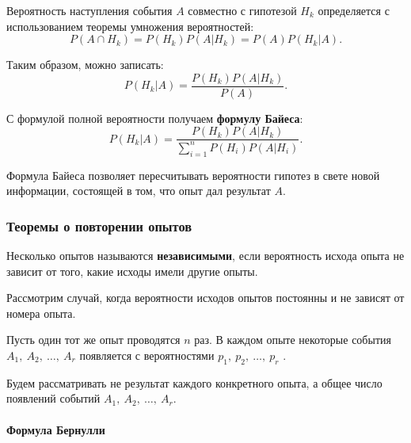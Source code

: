 \documentclass[a4paper]{article}
\newcommand{\key}[1]{{\color{Medium}\bfseries #1}}
\begin{document}
                Вероятность наступления события $A$ совместно с гипотезой $H_k$ определяется с использованием теоремы умножения вероятностей:
                \begin{equation*}
                    P(A \cap H_k) = P(H_k) P(A | H_k) = P(A) P(H_k | A) .
                \end{equation*}

                Таким образом, можно записать:
                \begin{equation*}
                    P(H_k | A) = \frac{P(H_k) P(A | H_k)}{P(A)} .
                \end{equation*}

                С формулой полной вероятности получаем \key{формулу Байеса}:
                \begin{equation*}
                    P(H_k | A) =
                        \frac{P(H_k) P(A | H_k)}{\sum\limits_{i = 1}^{n} P(H_i) P(A | H_i)} .
                \end{equation*}

                Формула Байеса позволяет пересчитывать вероятности гипотез в свете новой информации, состоящей в том, что опыт дал результат $A$.

            \subsubsection{Теоремы о повторении опытов}

                Несколько опытов называются \key{независимыми}, если вероятность исхода опыта не зависит от того, какие исходы имели другие опыты.
                
                Рассмотрим случай, когда вероятности исходов опытов постоянны и не зависят от номера опыта.
                
                Пусть один тот же опыт проводятся $n$ раз. В каждом опыте некоторые события $A_1 , \: A_2 , \: \ldots , \: A_r$ появляется с вероятностями $p_1 , \: p_2 , \: \ldots , \: p_r$ .
                
                Будем рассматривать не результат каждого конкретного опыта, а общее число появлений событий $A_1 , \: A_2 , \: \ldots , \: A_r$.

                \paragraph{Формула Бернулли}
\end{document}
